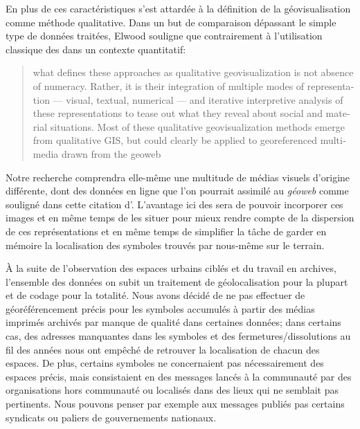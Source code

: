 En plus de ces caractéristiques \citet{Elwood2011} s'est attardée à la définition de la géovisualisation comme méthode qualitative. 
Dans un but de comparaison dépassant le simple type de données traitées, Elwood souligne que contrairement à l'utilisation classique des \sig{} dans un contexte quantitatif: \foreignblockquote{english}[{\cite{Elwood2011}}][.]{\textelp{} what defines   these approaches as qualitative geovisualization is not absence of numeracy.
  Rather, it is their integration of multiple modes of representation –--  visual, textual, numerical --– and iterative interpretive analysis of these representations to tease out what they reveal about social and material situations. 
Most of these qualitative geovisualization methods emerge from qualitative GIS, but could clearly be applied to georeferenced multimedia drawn from the geoweb}. 
Notre recherche comprendra elle-même une multitude de médias visuels d'origine différente, dont des données en ligne que l'on pourrait assimilé au \emph{géoweb} comme souligné dans cette citation d'\citeauthor{Elwood2011}. 
L'avantage ici des \sig{} sera de pouvoir incorporer ces images et en même temps de les situer pour mieux rendre compte de la dispersion de ces représentations et en même temps de simplifier la tâche de garder en mémoire la localisation des symboles trouvés par nous-même sur le terrain.

À la suite de l'observation des espaces urbains ciblés et du travail en archives, l'ensemble des données on subit un traitement de géolocalisation pour la plupart et de codage pour la totalité. 
Nous avons décidé de ne pas effectuer de géoréférencement précis pour les symboles accumulés à partir des médias imprimés archivés par manque de qualité dans certaines données; dans certains cas, des adresses manquantes dans les symboles et des fermetures/dissolutions au fil des années nous ont empêché de retrouver la localisation de chacun des espaces. 
De plus, certains symboles ne concernaient pas nécessairement des espaces précis, mais consistaient en des messages lancés à la communauté par des organisations hors communauté ou localisés  dans des lieux qui ne semblait pas  pertinents. 
Nous pouvons penser par exemple aux messages publiés pas certains syndicats ou paliers de gouvernements nationaux.

